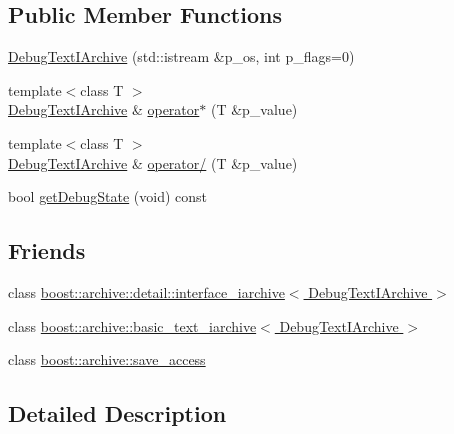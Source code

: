 \subsection*{Public Member Functions}
\begin{DoxyCompactItemize}
\item 
\hyperlink{classxtd_1_1serializer_1_1DebugTextIArchive_a97b036aced6a2612a505bca126b8e4da}{Debug\+Text\+I\+Archive} (std\+::istream \&p\+\_\+os, int p\+\_\+flags=0)
\item 
{\footnotesize template$<$class T $>$ }\\\hyperlink{classxtd_1_1serializer_1_1DebugTextIArchive}{Debug\+Text\+I\+Archive} \& \hyperlink{classxtd_1_1serializer_1_1DebugTextIArchive_a7fb53e65348749bad9e2b945b03c1e9a}{operator$\ast$} (T \&p\+\_\+value)
\item 
{\footnotesize template$<$class T $>$ }\\\hyperlink{classxtd_1_1serializer_1_1DebugTextIArchive}{Debug\+Text\+I\+Archive} \& \hyperlink{classxtd_1_1serializer_1_1DebugTextIArchive_a8c9fb4b382705609a5cd1570c63818f1}{operator/} (T \&p\+\_\+value)
\item 
bool \hyperlink{classxtd_1_1serializer_1_1DebugTextIArchive_a3ad42e3b468f60546bc76b21247ee0ca}{get\+Debug\+State} (void) const 
\end{DoxyCompactItemize}
\subsection*{Friends}
\begin{DoxyCompactItemize}
\item 
class \hyperlink{classxtd_1_1serializer_1_1DebugTextIArchive_af9e30d7c11da39f8fdf5fd8c21e4e831}{boost\+::archive\+::detail\+::interface\+\_\+iarchive$<$ Debug\+Text\+I\+Archive $>$}
\item 
class \hyperlink{classxtd_1_1serializer_1_1DebugTextIArchive_a6fe2ce7d54600795abdea507c1270a7a}{boost\+::archive\+::basic\+\_\+text\+\_\+iarchive$<$ Debug\+Text\+I\+Archive $>$}
\item 
class \hyperlink{classxtd_1_1serializer_1_1DebugTextIArchive_aaca003bb8a4fc59424e4025130da4edd}{boost\+::archive\+::save\+\_\+access}
\end{DoxyCompactItemize}


\subsection{Detailed Description}


